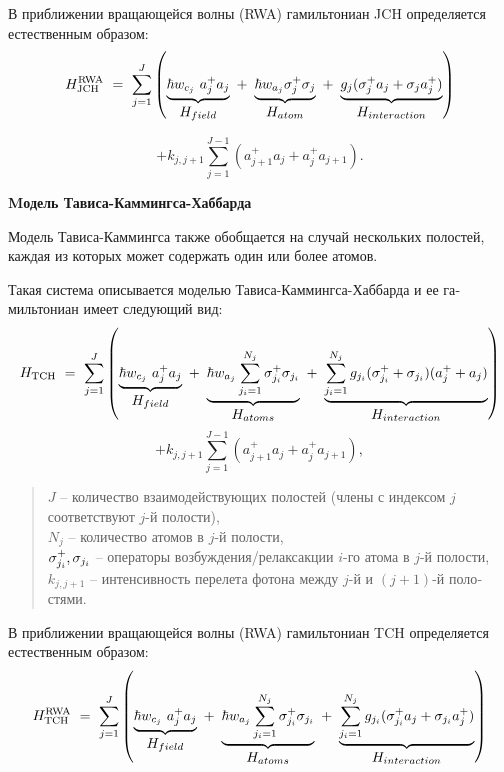 В приближении вращающейся волны (RWA) \cite{rwa_rabi_1,rwa_rabi_2,ozhigov_qq} гамильтониан JCH определяется естественным образом:
\[
H_{\text{JCH}}^{\text{RWA}}~=~\sum_{j=1}^J \left(\underbrace{\hbar w_{c_j}\ a_j^+a_j}_{\textstyle H_{field}}~+~\underbrace{\hbar w_{a_j}{\sigma_{j}^+\sigma_{j}}}_{\textstyle H_{atom}}~+~\underbrace{g_j{(\sigma_{j}^+a_j+\sigma_{j}a_j^+)}}_{\textstyle H_{interaction}} \right)
\]

\begin{equation}
	+k_{j,j+1}\sum_{j=1}^{J-1}{\left(a_{j+1}^+a_j+a_{j}^+a_{j+1}\right)}.
\end{equation}

\clearpage
\indent\textbf{Mодель Тависа-Каммингса-Хаббарда}

Модель Тависа-Каммингса также обобщается на случай нескольких поло­стей, каждая из которых может содержать один или более атомов.
\begin{figure}[h!]
	\noindent{}
\end{figure}

Такая система описывается моделью Тависа-Каммингса-Хаббарда \cite{tch_photon_blockade,tch_transfer,tch_quality} и ее га­мильтониан имеет следующий вид:
\[
H_{\text{TCH}}~=~\sum_{j=1}^J \left(\underbrace{\hbar w_{c_{j}}\ a_j^+a_{j}}_{\textstyle H_{field}}~+~\underbrace{\hbar w_{a_{j}}\sum_{j_{i}=1}^{N_{j}}{\sigma_{j_i}^+\sigma_{j_i}}}_{\textstyle H_{atoms}}~+~\underbrace{\sum_{j_{i}=1}^{N_{j}}g_{j_i}{(\sigma_{j_i}^{+}+\sigma_{j_i})(a_{j}^{+}+a_{j})}}_{\textstyle H_{interaction}} \right)
\]
\begin{equation}
	+k_{j,j+1}\sum_{j=1}^{J-1}{\left(a_{j+1}^+a_j+a_{j}^+a_{j+1}\right)},
\end{equation}
\begin{quote}
	$J$ -- количество взаимодействующих полостей (члены с индексом $j$ соответствуют $j$-й полости),\\
	$N_{j}$ -- количество атомов в $j$-й полости,\\
	$\sigma_{j_i}^{+},\sigma_{j_i}$ -- операторы возбуждения/релаксакции $i$-го атома в $j$-й полости,\\
	$k_{j,j+1}$ -- интенсивность перелета фотона между $j$-й и $(j+1)$-й поло­стями.
\end{quote}

В приближении вращающейся волны (RWA) \cite{rwa_rabi_1,rwa_rabi_2,ozhigov_qq} гамильтониан TCH определяется естественным образом:
\[
H_{\text{TCH}}^{\text{RWA}}~=~\sum_{j=1}^J \left(\underbrace{\hbar w_{c_j}\ a_j^+a_j}_{\textstyle H_{field}}~+~\underbrace{\hbar w_{a_j}\sum_{j_{i}=1}^{N_{j}}{\sigma_{j_i}^+\sigma_{j_i}}}_{\textstyle H_{atoms}}~+~\underbrace{\sum_{j_{i}=1}^{N_{j}}g_{j_i}{(\sigma_{j_i}^+a_j+\sigma_{j_i}a_j^+)}}_{\textstyle H_{interaction}} \right)
\]

